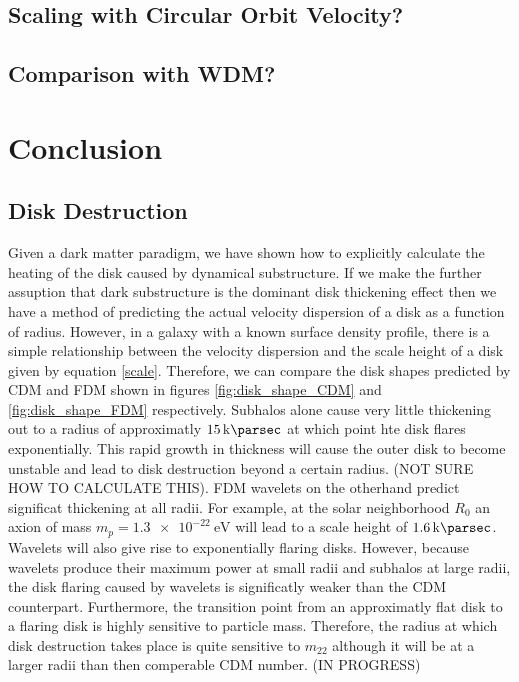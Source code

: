 \documentclass[usenatbib]{mnras}
\begin{document}
\subsection{Scaling with Circular Orbit Velocity?}

\subsection{Comparison with WDM?}


\section{Conclusion}

\subsection{Disk Destruction}

Given a dark matter paradigm, we have shown how to explicitly calculate the heating of the disk caused by dynamical substructure. If we make the further assuption that dark substructure is the dominant disk thickening effect then we have a method of predicting the actual velocity dispersion of a disk as a function of radius. However, in a galaxy with a known surface density   profile, there is a simple relationship between the velocity dispersion and the scale height of a disk given by equation \ref{scale}. Therefore, we can compare the disk shapes predicted by CDM and FDM shown in figures \ref{fig:disk_shape_CDM} and \ref{fig:disk_shape_FDM} respectively. Subhalos alone cause very little thickening out to a radius of approximatly $\SI{15}{\kilo \parsec}$ at which point hte disk flares exponentially. This rapid growth in thickness will cause the outer disk to become unstable and lead to disk destruction beyond a certain radius. (NOT SURE HOW TO CALCULATE THIS). FDM wavelets on the otherhand predict significat thickening at all radii. For example, at the solar neighborhood $R_0$ an axion of mass $m_p = \SI{1.3 e-22}{\electronvolt}$ will lead to a scale height of $\SI{1.6}{ \kilo\parsec}$. Wavelets will also give rise to exponentially flaring disks. However, because wavelets produce their maximum power at small radii and subhalos at large radii, the disk flaring caused by wavelets is significatly weaker than the CDM counterpart. Furthermore, the transition point from an approximatly flat disk to a flaring disk is highly sensitive to particle mass. Therefore, the radius at which disk destruction takes place is quite sensitive to $m_{22}$ although it will be at a larger radii than then comperable CDM number. (IN PROGRESS)
\end{document}
